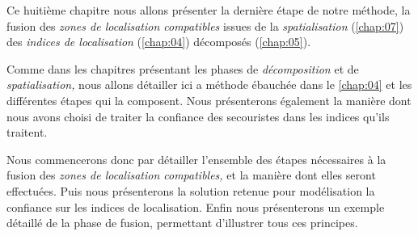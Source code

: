 Ce huitième chapitre nous allons présenter la dernière étape de notre
méthode, la fusion des \emph{zones de localisation compatibles} issues
de la \emph{spatialisation} (\autoref{chap:07}) des \emph{indices de
  localisation} (\autoref{chap:04}) décomposés (\autoref{chap:05}).

Comme dans les chapitres présentant les phases de \emph{décomposition}
et de \emph{spatialisation,} nous allons détailler ici a méthode
ébauchée dans le \autoref{chap:04} et les différentes étapes qui la
composent. Nous présenterons également la manière dont nous avons
choisi de traiter la confiance des secouristes dans les indices qu'ils
traitent.

Nous commencerons donc par détailler l'ensemble des étapes nécessaires
à la fusion des \emph{zones de localisation compatibles,} et la
manière dont elles seront effectuées. Puis nous présenterons la
solution retenue pour modélisation la confiance sur les indices de
localisation. Enfin nous présenterons un exemple détaillé de la phase
de fusion, permettant d'illustrer tous ces principes.

